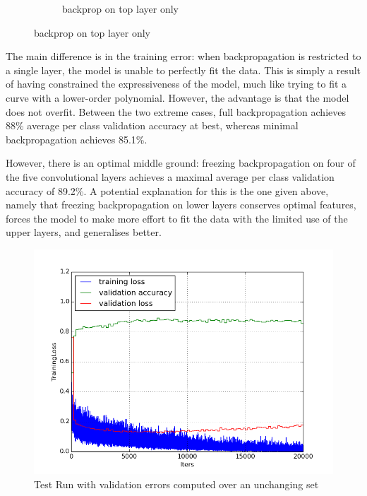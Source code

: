 \documentclass[a4paper,11pt]{article}
\begin{document}
\begin{figure}
\begin{minipage}[b]{\textwidth}
\begin{subfigure}{.5\textwidth}
        \caption{backprop on top layer only}\label{fig:2b}
      \end{subfigure} \par \vspace*{20pt} %
    \end{minipage}%
    \label{f38}
\end{figure}

The main difference is in the training error: when backpropagation is restricted to a single layer, the model is unable to perfectly fit the data. This is simply a result of having constrained the expressiveness of the model, much like trying to fit a curve with a lower-order polynomial. However, the advantage is that the model does not overfit. Between the two extreme cases, full backpropagation achieves 88\% average per class validation accuracy at best, whereas minimal backpropagation achieves 85.1\%. 

However, there is an optimal middle ground: freezing backpropagation on four of the five convolutional layers achieves a maximal average per class validation accuracy of 89.2\%. A potential explanation for this is the one given above, namely that freezing backpropagation on lower layers conserves optimal features, forces the model to make more effort to fit the data with the limited use of the upper layers, and generalises better. \\

\begin{figure}[h!]
	\centering
	\includegraphics[scale=0.5]{images/plot_clampdet_conv4.png}
	\caption{Test Run with validation errors computed over an unchanging set}
    \label{f29}
\end{figure}
\end{document}
